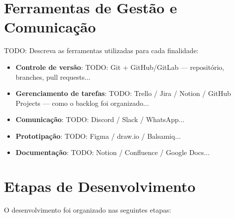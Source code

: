 \section{Ferramentas de Gestão e Comunicação}
\label{sec:ferramentas-gestao}

TODO: Descreva as ferramentas utilizadas para cada finalidade:

\begin{itemize}
  \item \textbf{Controle de versão}: TODO: Git + GitHub/GitLab — repositório,
        branches, pull requests...
  \item \textbf{Gerenciamento de tarefas}: TODO: Trello / Jira / Notion /
        GitHub Projects — como o backlog foi organizado...
  \item \textbf{Comunicação}: TODO: Discord / Slack / WhatsApp...
  \item \textbf{Prototipação}: TODO: Figma / draw.io / Balsamiq...
  \item \textbf{Documentação}: TODO: Notion / Confluence / Google Docs...
\end{itemize}


\section{Etapas de Desenvolvimento}
\label{sec:etapas}

O desenvolvimento foi organizado nas seguintes etapas:

